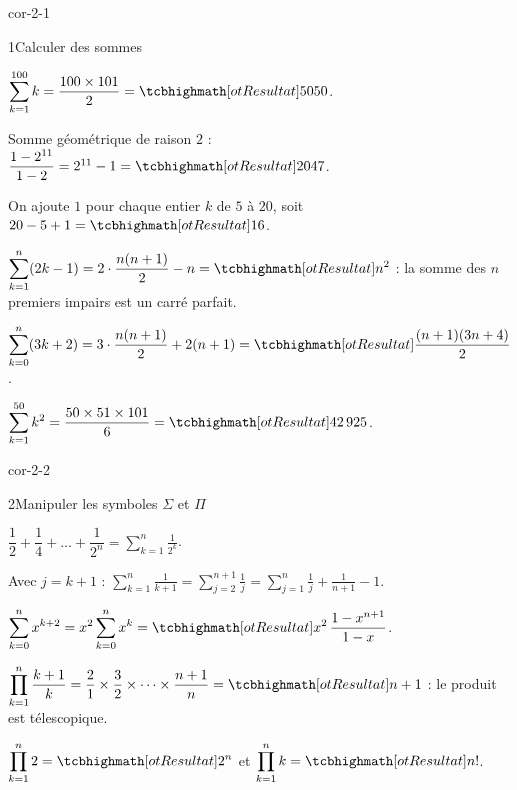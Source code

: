 
\corrigesSouples

\begin{blocLivre}{cor-2-1}
\begin{corrige}{1}{Calculer des sommes}
\begin{questions}
  \item $\displaystyle\sum_{k=1}^{100}k=\frac{100\times101}{2}=\res{5050}$.
  \item Somme géométrique de raison $2$ : $\dfrac{1-2^{11}}{1-2}=2^{11}-1=\res{2047}$.
  \item On ajoute $1$ pour chaque entier $k$ de $5$ à $20$, soit $20-5+1=\res{16}$.
  \item $\displaystyle\sum_{k=1}^{n}(2k-1)=2\cdot\frac{n(n+1)}{2}-n=\res{n^{2}}$ :
    la somme des $n$ premiers impairs est un carré parfait.
  \item $\displaystyle\sum_{k=0}^{n}(3k+2)=3\cdot\frac{n(n+1)}{2}+2(n+1)=\res{\frac{(n+1)(3n+4)}{2}}$.
  \item $\displaystyle\sum_{k=1}^{50}k^{2}=\frac{50\times51\times101}{6}=\res{42\,925}$.
\end{questions}
\end{corrige}
\end{blocLivre}

\begin{blocLivre}{cor-2-2}
\begin{corrige}{2}{Manipuler les symboles $\Sigma$ et $\Pi$}
\begin{questions}
  \item $\dfrac12+\dfrac14+\dots+\dfrac{1}{2^{n}}=\displaystyle\sum_{k=1}^{n}\frac{1}{2^{k}}$.
  \item Avec $j=k+1$ : $\displaystyle\sum_{k=1}^{n}\frac{1}{k+1}=\sum_{j=2}^{n+1}\frac{1}{j}
    =\sum_{j=1}^{n}\frac{1}{j}+\frac{1}{n+1}-1$.
  \item $\displaystyle\sum_{k=0}^{n}x^{k+2}=x^{2}\sum_{k=0}^{n}x^{k}=\res{x^{2}\,\frac{1-x^{n+1}}{1-x}}$.
  \item $\displaystyle\prod_{k=1}^{n}\frac{k+1}{k}=\frac{2}{1}\times\frac{3}{2}\times\dots\times\frac{n+1}{n}
    =\res{n+1}$ : le produit est télescopique.
  \item $\displaystyle\prod_{k=1}^{n}2=\res{2^{n}}$ et $\displaystyle\prod_{k=1}^{n}k=\res{n!}$.
\end{questions}
\end{corrige}
\end{blocLivre}


